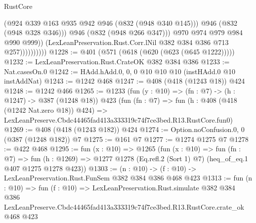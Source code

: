 \begin{lexlean}{RustCore}
\begin{coremodule}
                              (@924 @339 @163 @935 @942 @946 (@832 (@948 @340 @145)))
                              @946
                              (@832 (@948 @328 @346)))
                            @946
                            (@832 (@948 @266 @347)))
                          @970
                          @974
                          @979
                          @984
                          @990
                          @999))
                      (LexLeanPreservation.Rust.Corr.lNil @382 @384 @386 @713 @257))))))))))
@1228 := @401 (@571 (@618 (@620 (@623 (@645 @1222)))))
@1232 := LexLeanPreservation.Rust.CrateOK @382 @384 @386
@1233 := Nat.casesOn.{0}
@1242 := HAdd.hAdd.{0, 0, 0} @10 @10 @10 (instHAdd.{0} @10 instAddNat)
@1243 := @1242 @468
@1247 := @408 (@418 (@1243 @18)) @424
@1248 := @1242 @466
@1265 := @1233
    (fun (y : @10) => (fn : @7) -> (h : @1247) -> @387 (@1248 @18))
    @423
    (fun (fn : @7) =>
    fun (h : @408 (@418 (@1242 Nat.zero @18)) @424) =>
    LexLeanPreserve.Cbdc44465fad413a333319c74f7ce3bed.R13.RustCore.fun0)
@1269 := @408 (@418 (@1243 @182)) @424
@1274 := Option.noConfusion.{0, 0} (@387 (@1248 @182)) @7
@1275 := @161 @7
@1277 := @1274 @1275 @7
@1278 := @422 @468
@1295 := fun (x : @10) =>
  @1265
    (fun (x : @10) =>
    fun (fn : @7) =>
    fun (h : @1269) => @1277 @1278 (Eq.refl.{2} (Sort 1) @7) (heq_of_eq.{1} @407 @1275 @1278 @423))
@1303 := (n : @10) -> (f : @10) -> LexLeanPreservation.Rust.FunSem @382 @384 @386 @468 @423
@1313 := fun (n : @10) =>
  fun (f : @10) =>
  LexLeanPreservation.Rust.simulate
    @382
    @384
    @386
    LexLeanPreserve.Cbdc44465fad413a333319c74f7ce3bed.R13.RustCore.crate_ok
    @468
    @423
\end{coremodule}
\end{lexlean}
